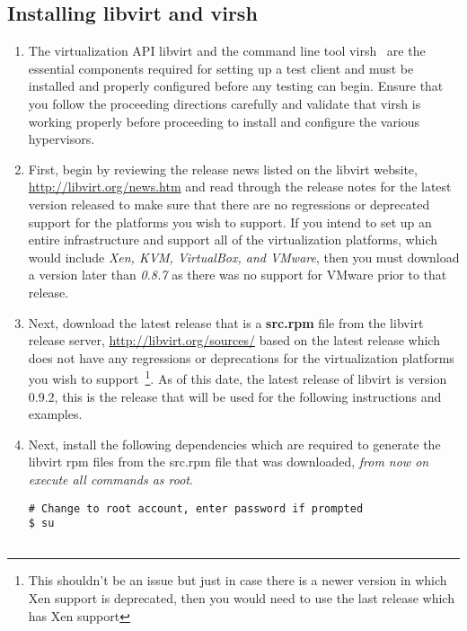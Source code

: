 \subsection{Installing libvirt and virsh}
\label{sec:rhvirsh}
\begin{enumerate}
\item	The virtualization API libvirt and the command line tool virsh~\cite{libvirt} are the essential components required 
		for setting up a test client and must be installed and properly configured before any testing can begin. Ensure that
		you follow the proceeding directions carefully and validate that virsh is working properly before proceeding to 
		install and configure the various hypervisors.
		
\item	First, begin by reviewing the release news listed on the libvirt website, \url{http://libvirt.org/news.htm} and read 
		through the release notes for the latest version released to make sure that there are no regressions or deprecated 
		support for the platforms you wish to support. If you intend to set up an entire infrastructure and support all of the
		\cernvm virtualization platforms, which would include \emph{Xen, KVM, VirtualBox, and VMware}, then you must download
		a version later than \emph{0.8.7} as there was no support for VMware prior to that release.

\item	Next, download the latest release that is a {\bf src.rpm} file from the libvirt release server, 
		\url{http://libvirt.org/sources/} based on the latest release which does not have any regressions or deprecations for
		the virtualization platforms you wish to support~\footnote{This shouldn't be an issue but just in case there is a 
		newer version in which Xen support is deprecated, then you would need to use the last release which has Xen support}.
		As of this date, the latest release of libvirt is version 0.9.2, this is the release that will be used for the
		following instructions and examples.
		
\item	Next, install the following dependencies which are required to generate the libvirt rpm files from the src.rpm file
		that was downloaded, \emph{from now on execute all commands as root}.
		
\lstset{language=bash,caption=Install src.rpm Dependencies}
\begin{lstlisting}
# Change to root account, enter password if prompted
$ su


\end{lstlisting}
\end{enumerate}
